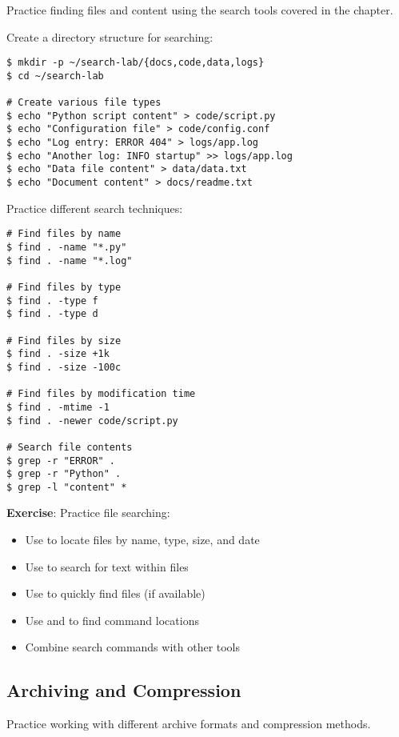 Practice finding files and content using the search tools covered in the chapter.

Create a directory structure for searching:

\begin{lstlisting}[style=bashstyle]
$ mkdir -p ~/search-lab/{docs,code,data,logs}
$ cd ~/search-lab

# Create various file types
$ echo "Python script content" > code/script.py
$ echo "Configuration file" > code/config.conf
$ echo "Log entry: ERROR 404" > logs/app.log
$ echo "Another log: INFO startup" >> logs/app.log
$ echo "Data file content" > data/data.txt
$ echo "Document content" > docs/readme.txt
\end{lstlisting}

Practice different search techniques:

\begin{lstlisting}[style=bashstyle]
# Find files by name
$ find . -name "*.py"
$ find . -name "*.log"

# Find files by type
$ find . -type f
$ find . -type d

# Find files by size
$ find . -size +1k
$ find . -size -100c

# Find files by modification time
$ find . -mtime -1
$ find . -newer code/script.py

# Search file contents
$ grep -r "ERROR" .
$ grep -r "Python" .
$ grep -l "content" *
\end{lstlisting}

\textbf{Exercise}: Practice file searching:
\begin{itemize}
    \item Use  to locate files by name, type, size, and date
    \item Use  to search for text within files
    \item Use  to quickly find files (if available)
    \item Use  and  to find command locations
    \item Combine search commands with other tools
\end{itemize}

\subsection{Archiving and Compression}

Practice working with different archive formats and compression methods.

